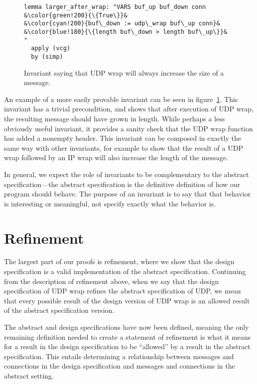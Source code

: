 \documentclass[twoside]{memoir}
\begin{document}
\begin{figure}
    \centering
\begin{lstlisting}[language=isabelle]
lemma larger_after_wrap: "VARS buf_up buf_down conn
&\color{green!200}{\{True\}}&
&\color{cyan!200}{buf\_down := udp\_wrap buf\_up conn}&
&\color{blue!180}{\{length buf\_down > length buf\_up\}}&
"
  apply (vcg)
  by (simp)
\end{lstlisting}
    \caption{Invariant saying that UDP wrap will always increase the size
        of a message.}
    \label{fig:inv-wrap-inc}
\end{figure}

An example of a more easily provable invariant can be seen in figure~\ref{fig:inv-wrap-inc}. This invariant has a trivial precondition,
and shows that after execution of UDP wrap, the resulting
message should have grown in length.
While perhaps a less obviously useful invariant,
it provides a sanity check that the UDP wrap function
has added a nonempty header.
This invariant can be composed in exactly the same way with other
invariants, for example to show that the result of a UDP wrap followed
by an IP wrap will also increase the length of the message.

In general, we expect the role of invariants to be complementary to the
abstract specification---the abstract specification is the definitive
definition of how our program should behave.
The purpose of an invariant is to say that that behavior is interesting
or meaningful, not specify exactly what the behavior is.


\section{Refinement}

The largest part of our proofs is refinement, where we show that
the design specification is a valid implementation of the abstract specification.
Continuing from the description of refinement above,
when we say that the design specification of UDP wrap refines the
abstract specification of UDP, we mean that
every possible result of the design version of UDP wrap is an allowed
result of the abstract specification version.

The abstract and design specifications have now been defined, meaning the
only remaining definition needed to create a statement of refinement is
what it means for a result in the design specification to be ``allowed''
by a result in the abstract specification.
This entails determining a relationship between messages and connections
in the design specification and messages and connections in the abstract setting.
\end{document}
